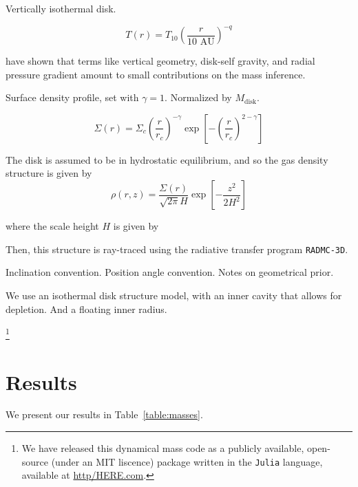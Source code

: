 \documentclass[twocolumn]{aastex6}
\begin{document}
Vertically isothermal disk.

\begin{equation}
	T(r) = T_{10} \left ( \frac{r}{\textrm{10 AU}}\right)^{-q}
\end{equation}

\citet{rosenfeld13a} have shown that terms like vertical geometry, disk-self gravity, and radial pressure gradient amount to small contributions on the mass inference.

Surface density profile, set with $\gamma = 1$. Normalized by $M_\textrm{disk}$.

\begin{equation}
\Sigma(r) = \Sigma_c \left (\frac{r}{r_c} \right)^{- \gamma} \exp \left[ - \left(\frac{r}{r_c} \right)^{2 - \gamma} \right]
\end{equation}

The disk is assumed to be in hydrostatic equilibrium, and so the gas density structure is given by
\begin{equation}
\rho(r, z) = \frac{\Sigma(r)}{\sqrt{2 \pi} H} \exp \left [- \frac{z^2}{2 H^2} \right]
\end{equation}

where the scale height $H$ is given by


Then, this structure is ray-traced using the radiative transfer program \texttt{RADMC-3D}.







Inclination convention. Position angle convention. Notes on geometrical prior.

We use an isothermal disk structure model, with an inner cavity that allows for depletion. And a floating inner radius.

\footnote{We have released this dynamical mass code as a publicly available, open-source (under an MIT liscence) package written in the \texttt{Julia} language, available at \url{http/HERE.com}.}

\section{Results}

We present our results in Table~\ref{table:masses}.

\end{document}
